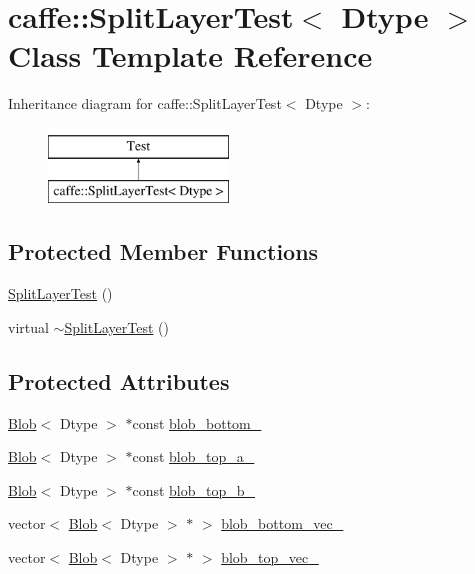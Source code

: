 \hypertarget{classcaffe_1_1_split_layer_test}{\section{caffe\+:\+:Split\+Layer\+Test$<$ Dtype $>$ Class Template Reference}
\label{classcaffe_1_1_split_layer_test}
}
Inheritance diagram for caffe\+:\+:Split\+Layer\+Test$<$ Dtype $>$\+:\begin{figure}[H]
\begin{center}
\leavevmode
\includegraphics[height=2.000000cm]{classcaffe_1_1_split_layer_test}
\end{center}
\end{figure}
\subsection*{Protected Member Functions}
\begin{DoxyCompactItemize}
\item 
\hyperlink{classcaffe_1_1_split_layer_test_a59ac6556536e4299790b49b225f6b265}{Split\+Layer\+Test} ()
\item 
virtual \hyperlink{classcaffe_1_1_split_layer_test_a54301be63f89864c3205a0cb2a142a9e}{$\sim$\+Split\+Layer\+Test} ()
\end{DoxyCompactItemize}
\subsection*{Protected Attributes}
\begin{DoxyCompactItemize}
\item 
\hyperlink{classcaffe_1_1_blob}{Blob}$<$ Dtype $>$ $\ast$const \hyperlink{classcaffe_1_1_split_layer_test_a0902834bf63f00ca3e17a29887e4da4f}{blob\+\_\+bottom\+\_\+}
\item 
\hyperlink{classcaffe_1_1_blob}{Blob}$<$ Dtype $>$ $\ast$const \hyperlink{classcaffe_1_1_split_layer_test_a8d0384e28d23ffdd556815e88d6331c9}{blob\+\_\+top\+\_\+a\+\_\+}
\item 
\hyperlink{classcaffe_1_1_blob}{Blob}$<$ Dtype $>$ $\ast$const \hyperlink{classcaffe_1_1_split_layer_test_a84fac4db116cd72b0f1c05fda18bb25f}{blob\+\_\+top\+\_\+b\+\_\+}
\item 
vector$<$ \hyperlink{classcaffe_1_1_blob}{Blob}$<$ Dtype $>$ $\ast$ $>$ \hyperlink{classcaffe_1_1_split_layer_test_af3697bcedb6899ece2374d73a2d5be0c}{blob\+\_\+bottom\+\_\+vec\+\_\+}
\item 
vector$<$ \hyperlink{classcaffe_1_1_blob}{Blob}$<$ Dtype $>$ $\ast$ $>$ \hyperlink{classcaffe_1_1_split_layer_test_ac9d579b35358fc576093dd62395d683c}{blob\+\_\+top\+\_\+vec\+\_\+}
\end{DoxyCompactItemize}


